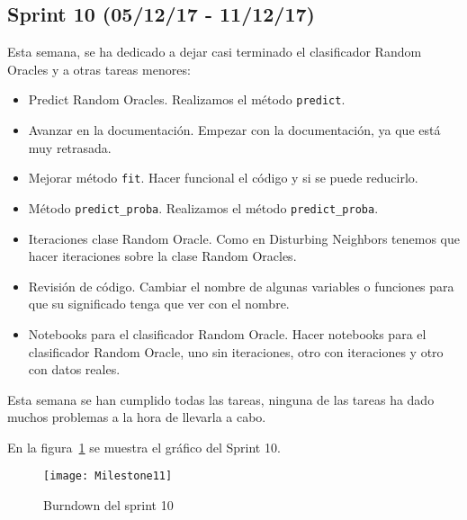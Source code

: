 \subsection{Sprint 10 (05/12/17 - 11/12/17)}
Esta semana, se ha dedicado a dejar casi terminado el clasificador Random Oracles y a otras tareas menores:
\begin{itemize}
\item Predict Random Oracles. Realizamos el método \texttt{predict}.
\item Avanzar en la documentación. Empezar con la documentación, ya que está muy retrasada.
\item Mejorar método \texttt{fit}. Hacer funcional el código y si se puede reducirlo.
\item Método \texttt{predict\_proba}. Realizamos el método \texttt{predict\_proba}.
\item Iteraciones clase Random Oracle. Como en Disturbing Neighbors tenemos que hacer iteraciones sobre la clase Random Oracles.
\item Revisión de código. Cambiar el nombre de algunas variables o funciones para que su significado tenga que ver con el nombre.
\item Notebooks para el clasificador Random Oracle. Hacer notebooks para el clasificador Random Oracle, uno sin iteraciones, otro con iteraciones y otro con datos reales.
\end{itemize}

Esta semana se han cumplido todas las tareas, ninguna de las tareas ha dado muchos problemas a la hora de llevarla a cabo.

En la figura~\ref{fig:Milestone11} se muestra el gráfico del Sprint 10.

\begin{figure}
\centering
\texttt{[image: Milestone11]}
\caption{Burndown del sprint 10}
\label{fig:Milestone11}
\end{figure}

